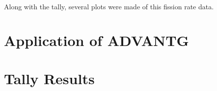 Along with the tally, several plots were made of this fission rate data.


\section{Application of ADVANTG}

\section{Tally Results}
